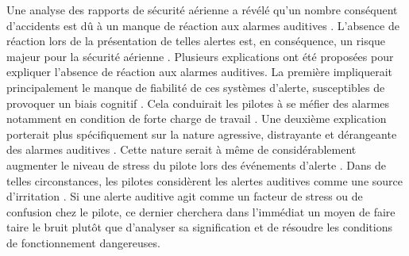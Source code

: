 Une analyse des rapports de sécurité aérienne a révélé qu'un nombre conséquent d'accidents est dû à un manque de réaction aux alarmes auditives \citep{bliss2003investigation}. 
L'absence de réaction lors de la présentation de telles alertes est, en conséquence, un risque majeur pour la sécurité aérienne \citep{bliss2003investigation, dehais2010perseveration, dehais2012missing, scannella2013effects}.
Plusieurs explications ont été proposées pour expliquer l'absence de réaction aux alarmes auditives. 
La première impliquerait principalement le manque de fiabilité de ces systèmes d'alerte, susceptibles de provoquer un biais cognitif \citep{breznitz1984psychology, wickens2009false}. 
Cela conduirait les pilotes à se méfier des alarmes \citep{shapiro1994nbc, song2001describing, sorkin1988people} notamment en condition de forte charge de travail \citep{bliss2000behavioural, dehais2012missing}. 
Une deuxième explication porterait plus spécifiquement sur la nature agressive, distrayante et dérangeante des alarmes auditives \citep{doll1984auditory, edworthy1991improving}. 
Cette nature serait à même de considérablement augmenter le niveau de stress du pilote lors des événements d'alerte \citep{peryer2005auditory, dehais2012missing}. 
Dans de telles circonstances, les pilotes considèrent les alertes auditives comme une source d'irritation \citep{patterson1982guidelines}. 
Si une alerte auditive agit comme un facteur de stress ou de confusion chez le pilote, ce dernier cherchera dans l'immédiat un moyen de faire taire le bruit plutôt que d'analyser sa signification et de résoudre les conditions de fonctionnement dangereuses. 


